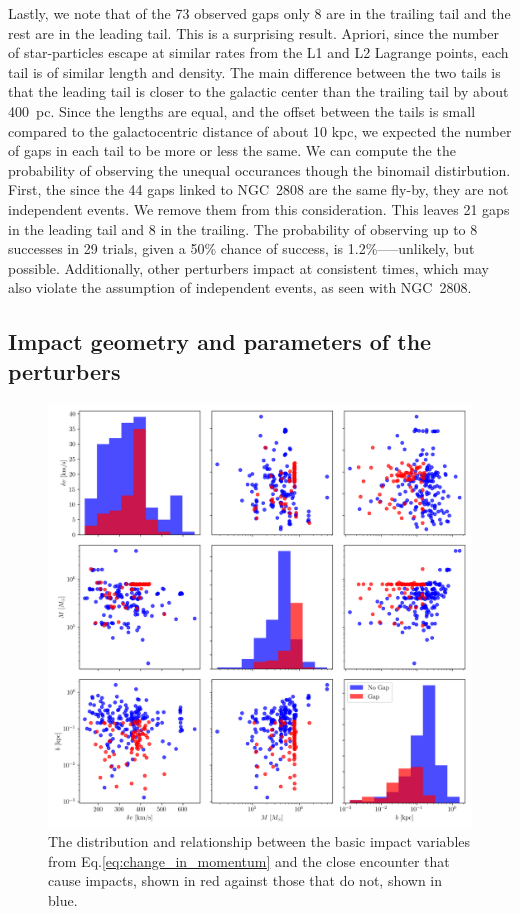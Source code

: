 \documentclass[draft]{aa}
\begin{document}
    Lastly, we note that of the 73 observed gaps only 8 are in the trailing tail and the rest are in the leading tail. This is a surprising result. Apriori, since the number of star-particles escape at similar rates from the L1 and L2 Lagrange points, each tail is of similar length and density. The main difference between the two tails is that the leading tail is closer to the galactic center than the trailing tail by about 400~pc. Since the lengths are equal, and the offset between the tails is small compared to the galactocentric distance of about 10 kpc, we expected the number of gaps in each tail to be more or less the same. We can compute the the probability of observing the unequal occurances though the binomail distirbution. First, the since the 44 gaps linked to NGC~2808 are the same fly-by, they are not independent events. We remove them from this consideration. This leaves 21 gaps in the leading tail and 8 in the trailing. The probability of observing up to 8 successes in 29 trials, given a 50\% chance of success, is 1.2\%--—unlikely, but possible. Additionally, other perturbers impact at consistent times, which may also violate the assumption of independent events, as seen with NGC~2808.


   
  \subsection{Impact geometry and parameters of the perturbers}\label{sect:geometry}
  
    \begin{figure}
      \centering
      \includegraphics[width=\linewidth]{impact_geometry_statistics.png}
      \caption{The distribution and relationship between the basic impact variables from Eq.\ref{eq:change_in_momentum} and the close encounter that cause impacts, shown in red against those that do not, shown in blue. }
      \label{fig:impact_geometry_statistics}    
    \end{figure}
\end{document}
